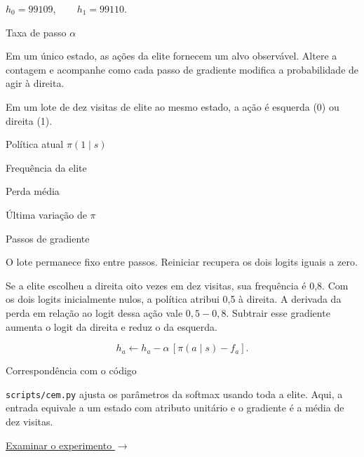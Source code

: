 $h_0=99109,\qquad h_1=99110$.

Taxa de passo $\alpha$ 

Em um único estado, as ações da elite fornecem um alvo observável. Altere a contagem e acompanhe como cada passo de gradiente modifica a probabilidade de agir à direita.

Em um lote de dez visitas de elite ao mesmo estado, a ação é esquerda (0) ou direita (1).

Política atual $\pi(1\mid s)$

Frequência da elite

Perda média

Última variação de $\pi$

Passos de gradiente

O lote permanece fixo entre passos. Reiniciar recupera os dois logits iguais a zero.

Se a elite escolheu a direita oito vezes em dez visitas, sua frequência é 0,8. Com os dois logits inicialmente nulos, a política atribui 0,5 à direita. A derivada da perda em relação ao logit dessa ação vale $0{,}5-0{,}8$. Subtrair esse gradiente aumenta o logit da direita e reduz o da esquerda.

\[h_a\gets h_a-\alpha\,[\pi(a\mid s)-f_a].\]

Correspondência com o código

\texttt{scripts/cem.py} ajusta os parâmetros da softmax usando toda a elite. Aqui, a entrada equivale a um estado com atributo unitário e o gradiente é a média de dez visitas.

\href{experimento.html}{Examinar o experimento $\rightarrow$}
